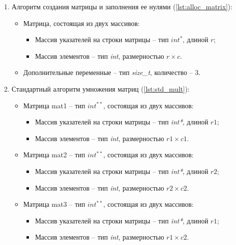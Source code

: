 \begin{enumerate}
    \item Алгоритм создания матрицы и заполнения ее нулями (\ref{lst:alloc_matrix}):
    \begin{itemize}
        \item Матрица, состоящая из двух массивов:
        \begin{itemize} 
            \item Массив указателей на строки матрицы -- тип \textit{$int^*$}, длиной \( r \);
            \item Массив элементов -- тип \textit{int}, размерностью \( r \times c \).
        \end{itemize}
        \item Дополнительные переменные -- тип \textit{size\_t}, количество -- 3.
    \end{itemize}
    \item Стандартный алгоритм умножения матриц (\ref{lst:std_mult}):
    \begin{itemize}
        \item Матрица mat1 -- тип \textit{$int^{**}$}, состоящая из двух массивов:
        \begin{itemize}
            \item Массив указателей на строки матрицы -- тип \textit{int*}, длиной \( r1 \);
            \item Массив элементов -- тип \textit{int}, размерностью \( r1 \times c1 \).
        \end{itemize}
        \item Матрица mat2 -- тип \textit{$int^{**}$}, состоящая из двух массивов:
        \begin{itemize}
            \item Массив указателей на строки матрицы -- тип \textit{int*}, длиной \( r2 \);
            \item Массив элементов -- тип \textit{int}, размерностью \( r2 \times c2 \).
        \end{itemize}
        \item Матрица mat3 -- тип \textit{$int^{**}$}, состоящая из двух массивов:
        \begin{itemize}
            \item Массив указателей на строки матрицы -- тип \textit{int*}, длиной \( r1 \);
            \item Массив элементов -- тип \textit{int}, размерностью \( r1 \times c2 \).
        \end{itemize}

\end{itemize}
\end{enumerate}
